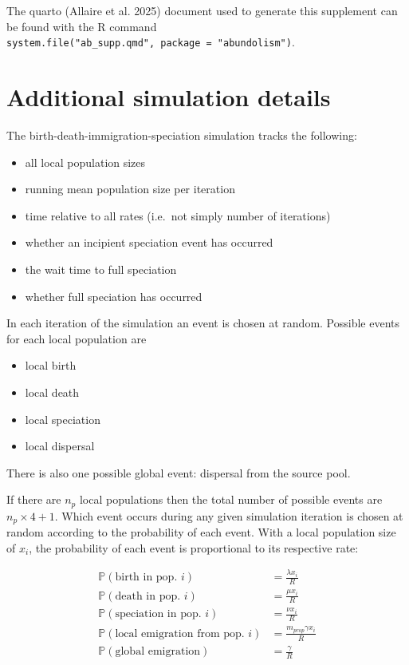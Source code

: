 \documentclass[
  letterpaper,
  DIV=11,
  numbers=noendperiod]{scrartcl}
\providecommand{\tightlist}{%
  \setlength{\itemsep}{0pt}\setlength{\parskip}{0pt}}
\begin{document}
The quarto (Allaire et al. 2025) document used to generate this
supplement can be found with the R command
\texttt{system.file("ab\_supp.qmd",\ package\ =\ "abundolism")}.

\section{Additional simulation details}\label{sec-sim}

The birth-death-immigration-speciation simulation tracks the following:

\begin{itemize}
\tightlist
\item
  all local population sizes
\item
  running mean population size per iteration
\item
  time relative to all rates (i.e.~not simply number of iterations)
\item
  whether an incipient speciation event has occurred
\item
  the wait time to full speciation
\item
  whether full speciation has occurred
\end{itemize}

In each iteration of the simulation an event is chosen at random.
Possible events for each local population are

\begin{itemize}
\tightlist
\item
  local birth
\item
  local death
\item
  local speciation
\item
  local dispersal
\end{itemize}

There is also one possible global event: dispersal from the source pool.

If there are \(n_p\) local populations then the total number of possible
events are \(n_p \times 4 + 1\). Which event occurs during any given
simulation iteration is chosen at random according to the probability of
each event. With a local population size of \(x_i\), the probability of
each event is proportional to its respective rate:

\begin{align}
\mathbb{P}(\text{birth in pop. } i) &= \frac{\lambda x_i}{R} \\
\mathbb{P}(\text{death in pop. } i) &= \frac{\mu x_i}{R} \\
\mathbb{P}(\text{speciation in pop. } i) &= \frac{\nu x_i}{R} \\
\mathbb{P}(\text{local emigration from pop. } i) &= \frac{m_{prop}\gamma x_i}{R} \\
\mathbb{P}(\text{global emigration}) &= \frac{\gamma}{R}
\end{align}
\end{document}
